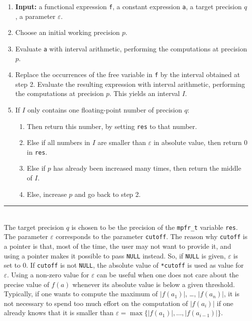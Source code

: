 \documentclass[a4paper]{article}
\begin{document}
\begin{enumerate}
\item[~]\textbf {Input:} a functional expression \verb|f|, a constant expression \verb|a|, a target precision $q$, a parameter $\varepsilon$.
\item Choose an initial working precision $p$.
\item Evaluate \verb|a| with interval arithmetic, performing the computations at precision $p$.
\item Replace the occurrences of the free variable in \verb|f| by the interval obtained at step 2. Evaluate the resulting expression with interval arithmetic, performing the computations at precision $p$. This yields an interval $I$.
\item If $I$ only contains one floating-point number of precision $q$:
  \begin{enumerate}
  \item Then return this number, by setting \verb|res| to that number.
  \item Else if all numbers in $I$ are smaller than $\varepsilon$ in absolute value, then return $0$ in \verb|res|.
  \item Else if $p$ has already been increased many times, then return the middle of $I$.
  \item Else, increase $p$ and go back to step 2.
  \end{enumerate}
\end{enumerate}
\vspace{-0.2cm}
\rule{\textwidth}{0.5px}\\[0.7cm]
The target precision $q$ is chosen to be the precision of the \verb|mpfr_t| variable \verb|res|. The parameter $\varepsilon$ corresponds to the parameter \verb|cutoff|. The reason why \verb|cutoff| is a pointer is that, most of the time, the user may not want to provide it, and using a pointer makes it possible to pass \verb|NULL| instead. So, if \verb|NULL| is given, $\varepsilon$ is set to $0$. If \verb|cutoff| is not \verb|NULL|, the absolute value of \verb|*cutoff| is used as value for $\varepsilon$. Using a non-zero value for $\varepsilon$ can be useful when one does not care about the precise value of $f(a)$ whenever its absolute value is below a given threshold. Typically, if one wants to compute the maximum of $|f(a_1)|$, \dots, $|f(a_n)|$, it is not necessary to spend too much effort on the computation of $|f(a_i)|$ if one already knows that it is smaller than $\varepsilon = \max \{|f(a_1)|,\dots,|f(a_{i-1})|\}$.
\end{document}
